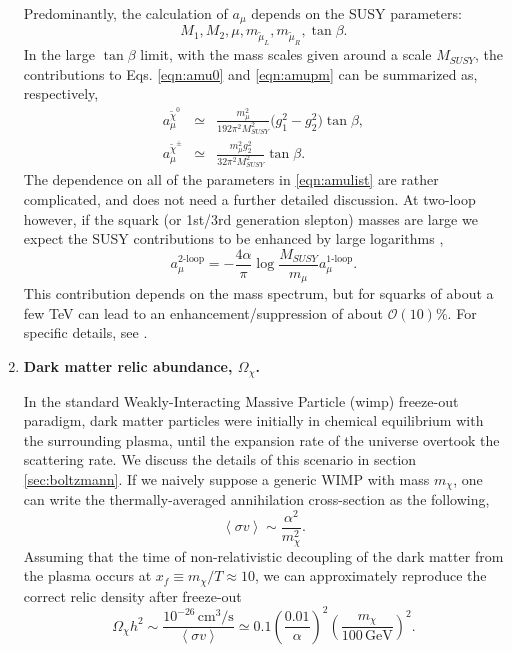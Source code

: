\begin{enumerate}
Predominantly, the calculation of $a_{\mu}$ depends on the SUSY parameters:
\begin{equation}
M_1,M_2,\mu,m_{\tilde{\mu}_L},m_{\tilde{\mu}_R},\tan \beta. \label{eqn:amulist}
\end{equation}
In the large $\tan \beta$ limit, with the mass scales given around a scale $M_{SUSY}$, the contributions to Eqs. \ref{eqn:amu0} and \ref{eqn:amupm} can be summarized as, respectively,
\begin{eqnarray}
a_{\mu}^{\widetilde\chi^0}&\simeq&\frac{m_{\mu}^2}{192\pi^2 M_{SUSY}^2}\Big(g_1^2-g_2^2\Big)\tan\beta, \\
a_{\mu}^{\widetilde\chi^{\pm}}&\simeq&\frac{m_{\mu}^2 g^{2}_2}{32\pi^2 M_{SUSY}^2}\tan\beta. 
\end{eqnarray}
The dependence on all of the parameters in \ref{eqn:amulist} are rather complicated, and does not need a further detailed discussion. At two-loop however, if the squark (or 1st/3rd generation slepton) masses are large we expect the SUSY contributions to be enhanced by large logarithms \cite{RN679},
\begin{equation}
a^{\text{2-loop}}_{\mu}=-\frac{4 \alpha}{\pi} \log{\frac{M_{SUSY}}{m_{\mu}}} a^{\text{1-loop}}_{\mu}.
\end{equation}
This contribution depends on the mass spectrum, but for squarks of about a few TeV can lead to an enhancement/suppression of about $\mathcal{O}(10)\%$. For specific details, see \cite{RN676,RN677,RN680}.

\item \textbf{Dark matter relic abundance, $\Omega_{\chi}$.} 

In the standard Weakly-Interacting Massive Particle (\acrshort{wimp}) freeze-out paradigm, dark matter particles were initially in chemical equilibrium with the surrounding plasma, until the expansion rate of the universe overtook the scattering rate. We discuss the details of this scenario in section \ref{sec:boltzmann}. If we naively suppose a generic WIMP with mass $m_{\chi}$, one can write the thermally-averaged annihilation cross-section as the following,
\begin{equation}
\left\langle \sigma v \right\rangle \sim \frac{\alpha^2}{m^2_{\chi}}.
\end{equation}
Assuming that the time of non-relativistic decoupling of the dark matter from the plasma occurs at $x_f \equiv m_{\chi}/T \approx 10$, we can approximately reproduce the correct relic density after freeze-out
\begin{equation}
\Omega_{\chi} h^2 \sim \frac{10^{-26}\,\text{cm}^3\text{/s}}{\left\langle \sigma v \right\rangle} \simeq 0.1 \left( \frac{0.01}{\alpha}\right)^2 \left( \frac{m_{\chi}}{100\,\text{GeV}}\right)^2.
\end{equation}


\end{enumerate}
